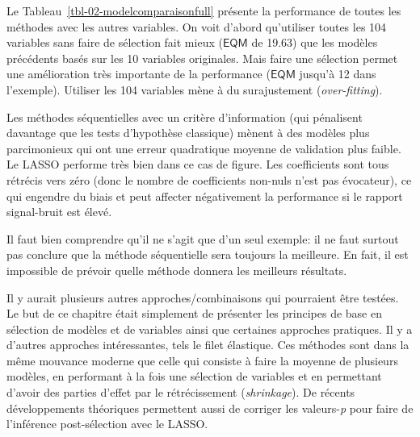 \documentclass[
  11pt,
  letterpaper,
]{book}
\theoremstyle{definition}
\theoremstyle{remark}
\begin{document}
Le Tableau~\ref{tbl-02-modelcomparaisonfull} présente la performance de
toutes les méthodes avec les autres variables. On voit d'abord
qu'utiliser toutes les 104 variables sans faire de sélection fait mieux
(\(\mathsf{EQM}\) de 19.63) que les modèles précédents basés sur les 10
variables originales. Mais faire une sélection permet une amélioration
très importante de la performance (\(\mathsf{EQM}\) jusqu'à 12 dans
l'exemple). Utiliser les 104 variables mène à du surajustement
(\emph{over-fitting}).

Les méthodes séquentielles avec un critère d'information (qui pénalisent
davantage que les tests d'hypothèse classique) mènent à des modèles plus
parcimonieux qui ont une erreur quadratique moyenne de validation plus
faible. Le LASSO performe très bien dans ce cas de figure. Les
coefficients sont tous rétrécis vers zéro (donc le nombre de
coefficients non-nuls n'est pas évocateur), ce qui engendre du biais et
peut affecter négativement la performance si le rapport signal-bruit est
élevé.

Il faut bien comprendre qu'il ne s'agit que d'un seul exemple: il ne
faut surtout pas conclure que la méthode séquentielle sera toujours la
meilleure. En fait, il est impossible de prévoir quelle méthode donnera
les meilleurs résultats.

Il y aurait plusieurs autres approches/combinaisons qui pourraient être
testées. Le but de ce chapitre était simplement de présenter les
principes de base en sélection de modèles et de variables ainsi que
certaines approches pratiques. Il y a d'autres approches intéressantes,
tels le filet élastique. Ces méthodes sont dans la même mouvance moderne
que celle qui consiste à faire la moyenne de plusieurs modèles, en
performant à la fois une sélection de variables et en permettant d'avoir
des parties d'effet par le rétrécissement (\emph{shrinkage}). De récents
développements théoriques permettent aussi de corriger les
valeurs-\emph{p} pour faire de l'inférence post-sélection avec le LASSO.
\end{document}
